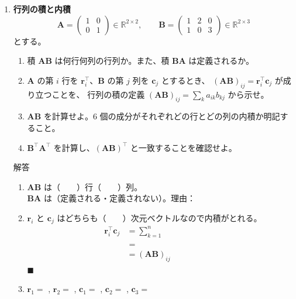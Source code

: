 \documentclass[a4paper,dvipdfmx]{jsarticle}
\newcommand{\提出期限}{2026年10月12日（月）}
\newcommand{\学籍番号}{0000000}
\newcommand{\氏名}{氏名を書く}
\newcommand{\提出日}{2026年10月12日}
\newenvironment{answer}{\begin{itembox}[l]{解答}}{\end{itembox}}
\begin{document}
\begin{enumerate}
  \item \textbf{行列の積と内積}\quad
    \begin{equation*}
      \bm{A} = \begin{pmatrix} 1 & 0 \\ 0 & 1 \end{pmatrix} \in \mathbb{R}^{2 \times 2},
      \qquad
      \bm{B} = \begin{pmatrix} 1 & 2 & 0 \\ 1 & 0 & 3 \end{pmatrix} \in \mathbb{R}^{2 \times 3}
    \end{equation*}
    とする。
    \begin{enumerate}
      \item 積 $\bm{A}\bm{B}$ は何行何列の行列か。また、積 $\bm{B}\bm{A}$ は定義されるか。
      \item $\bm{A}$ の第 $i$ 行を $\bm{r}_i^\top$、$\bm{B}$ の第 $j$ 列を $\bm{c}_j$ とするとき、
        $(\bm{A}\bm{B})_{ij} = \bm{r}_i^\top \bm{c}_j$ が成り立つことを、
        行列の積の定義 $(\bm{A}\bm{B})_{ij} = \sum_{k} a_{ik} b_{kj}$ から示せ。
      \item $\bm{A}\bm{B}$ を計算せよ。$6$ 個の成分がそれぞれどの行とどの列の内積か明記すること。
      \item $\bm{B}^\top \bm{A}^\top$ を計算し、$(\bm{A}\bm{B})^\top$ と一致することを確認せよ。
    \end{enumerate}
    \begin{answer}
      \begin{enumerate}
        \item $\bm{A}\bm{B}$ は（　　）行（　　）列。\\
          $\bm{B}\bm{A}$ は（定義される・定義されない）。理由：
        \item $\bm{r}_i$ と $\bm{c}_j$ はどちらも（　　）次元ベクトルなので内積がとれる。
          \begin{align*}
            \bm{r}_i^\top \bm{c}_j &= \sum_{k=1}^{n} \phantom{XXXXXXXX} \\
                                   &= \phantom{XXXXXXXX} \\
                                   &= (\bm{A}\bm{B})_{ij}
          \end{align*}
          \hfill $\blacksquare$
        \item $\bm{r}_1 = $ \phantom{XXXX}, $\bm{r}_2 = $ \phantom{XXXX},
          $\bm{c}_1 = $ \phantom{XXXX}, $\bm{c}_2 = $ \phantom{XXXX}, $\bm{c}_3 = $ \phantom{XXXX}

\end{enumerate}
\end{answer}
\end{enumerate}
\end{document}

